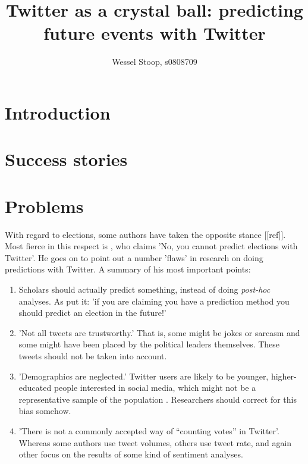 \documentclass[12pt]{article}
\title{Twitter as a crystal ball: predicting future events with Twitter}
\author{Wessel Stoop, s0808709}
\begin{document}
\maketitle

\section{Introduction}


\section{Success stories}



\section{Problems}

With regard to elections, some authors have taken the opposite stance [[ref]]. Most fierce in this respect is , who claims 'No, you cannot predict elections with Twitter'. He goes on to point out a number 'flaws' in research on doing predictions with Twitter. A summary of his most important points:

\begin{enumerate}
\item Scholars should actually predict something, instead of doing \emph{post-hoc} analyses. As  put it: 'if you are claiming you have a prediction method you should predict an election in the future!'
\item 'Not all tweets are trustworthy.' That is, some might be jokes or sarcasm and some might have been placed by the political leaders themselves. These tweets should not be taken into account.
\item 'Demographics are neglected.' Twitter users are likely to be younger, higher-educated people interested in social media, which might not be a representative sample of the population . Researchers should correct for this bias somehow.
\item 'There is not a commonly accepted way of “counting votes” in Twitter'. Whereas some authors use tweet volumes, others use tweet rate, and again other focus on the results of some kind of sentiment analyses.
\end{enumerate}
\end{document}
